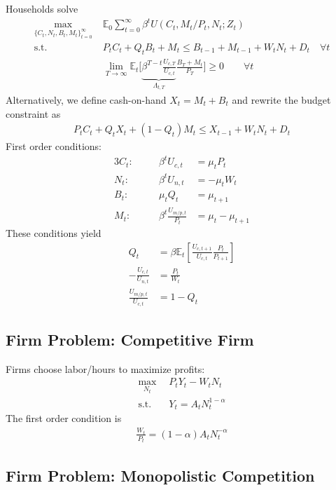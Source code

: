 \documentclass[12pt]{article}
\theoremstyle{plain}
\theoremstyle{definition}
\theoremstyle{remark}
\newcommand{\limT}{\lim_{T\rightarrow\infty}}
\newcommand{\E}{\mathbb{E}}
\newcommand{\sumtinfz}{\sum^\infty_{t=0}}
\newcommand{\tinfz}{^\infty_{t=0}}
\begin{document}
Households solve
\begin{align*}
  \max_{\{C_t,N_t,B_t,M_t\}\tinfz} \;
  &\E_0\sumtinfz \beta^t U(C_t,M_t/P_t,N_t;Z_t) \\
  \text{s.t.}\quad&
  P_tC_t + Q_{t}B_t + M_t
  \leq B_{t-1} + M_{t-1} + W_tN_t + D_t\quad \forall t\\
  &\limT \E_t\bigg[
    \underbrace{\beta^{T-t} \frac{U_{c,T}}{U_{c,t}}}_{\Lambda_{t,T}}
    \frac{B_T+M_t}{P_T}
  \bigg]
  \geq 0
  \qquad \forall t
\end{align*}
Alternatively, we define cash-on-hand $X_t=M_t+B_t$ and rewrite the
budget constraint as
\begin{align*}
  P_tC_t
  + Q_{t}X_t
  + (1-Q_{t})M_t
  \leq X_{t-1} + W_tN_t + D_t
\end{align*}
First order conditions:
\begin{alignat*}{3}
  C_t:&&\quad
  \beta^t U_{c,t} &= \mu_t P_t \\
  N_t:&&\quad
  \beta^t U_{n,t} &= -\mu_t W_t \\
  B_t:&&\quad
  \mu_t Q_t &= \mu_{t+1} \\
  M_t:&&\quad
  \beta^t \frac{U_{m/p,t}}{P_t}
  &=
  \mu_t - \mu_{t+1}
\end{alignat*}
These conditions yield
\begin{align*}
  Q_t &= \beta \E_t\left[
    \frac{U_{c,t+1}}{U_{c,t}}\frac{P_t}{P_{t+1}}
  \right]
  \\
  -\frac{U_{c,t}}{U_{n,t}} &= \frac{P_t}{W_t}
  \\
  \frac{U_{m/p,t}}{U_{c,t}}
  &=
  1 - Q_t
\end{align*}



\clearpage
\subsection{Firm Problem: Competitive Firm}


Firms choose labor/hours to maximize profits:
\begin{align*}
  \max_{N_t} \; &P_tY_t - W_tN_t \\
  \text{s.t.} \quad &Y_t =A_tN_t^{1-\alpha}
\end{align*}
The first order condition is
\begin{align*}
  \frac{W_t}{P_t} = (1-\alpha) A_t N_t^{-\alpha}
\end{align*}


\subsection{Firm Problem: Monopolistic Competition}
\end{document}
